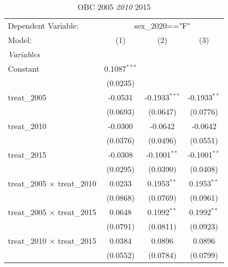 
\begin{table}[htbp]
   \caption{OBC 2005 \textit{ 2010 } 2015}
   \centering
   \begin{tabular}{lccc}
      \tabularnewline \midrule \midrule
      Dependent Variable: & \multicolumn{3}{c}{sex\_2020=="F"}\\
      Model:                                                     & (1)            & (2)             & (3)\\  
      \midrule
      \emph{Variables}\\
      Constant                                                   & 0.1087$^{***}$ &                 &   \\   
                                                                 & (0.0235)       &                 &   \\   
      treat\_2005                                                & -0.0531        & -0.1933$^{***}$ & -0.1933$^{**}$\\   
                                                                 & (0.0693)       & (0.0647)        & (0.0776)\\   
      treat\_2010                                                & -0.0300        & -0.0642         & -0.0642\\   
                                                                 & (0.0376)       & (0.0496)        & (0.0551)\\   
      treat\_2015                                                & -0.0308        & -0.1001$^{**}$  & -0.1001$^{**}$\\   
                                                                 & (0.0295)       & (0.0390)        & (0.0408)\\   
      treat\_2005 $\times$ treat\_2010                           & 0.0233         & 0.1953$^{**}$   & 0.1953$^{**}$\\   
                                                                 & (0.0868)       & (0.0769)        & (0.0961)\\   
      treat\_2005 $\times$ treat\_2015                           & 0.0648         & 0.1992$^{**}$   & 0.1992$^{**}$\\   
                                                                 & (0.0791)       & (0.0811)        & (0.0923)\\   
      treat\_2010 $\times$ treat\_2015                           & 0.0384         & 0.0896          & 0.0896\\   
                                                                 & (0.0552)       & (0.0784)        & (0.0799)\\   

\end{tabular}
\end{table}
